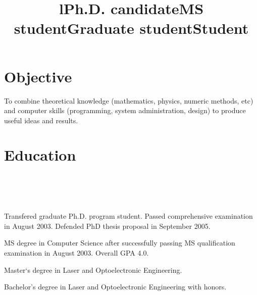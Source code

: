 \documentclass[10pt,overlapped,line]{res}
\begin{document}
\begin{resume}

\section{Objective}
To combine theoretical knowledge (mathematics, physics, numeric
methods, etc) and computer skills (programming, system administration,
design) to produce useful ideas and results.

\section{Education}
\begin{format}
  \title{l}\\
  \\
  \body\\
\end{format}

\title{Ph.D. candidate}
\begin{position}
  Transfered graduate Ph.D. program student. Passed comprehensive
  examination in August 2003. Defended PhD thesis proposal in
  September 2005.
\end{position}

 \title{MS student}
 \begin{position}
  MS degree in Computer Science after successfully passing MS
 qualification examination in August 2003.  Overall GPA 4.0.
 \end{position}

 \title{Graduate student}
 \begin{position}
  Master`s degree in Laser and Optoelectronic Engineering.
 \end{position}

 \title{Student}
 \begin{position}
  Bachelor's degree in Laser and Optoelectronic Engineering with
  honors.
 \end{position}


\end{resume}
\end{document}
